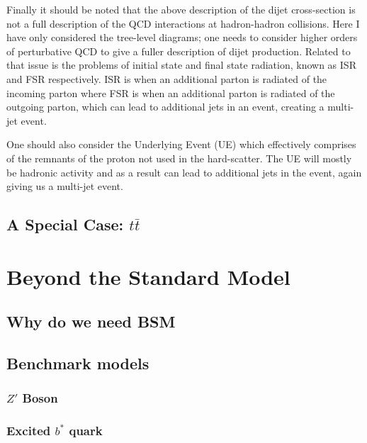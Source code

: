 Finally it should be noted that the above description of the dijet cross-section is
not a full description of the QCD interactions at hadron-hadron collisions.
Here I have only considered the tree-level diagrams;
one needs to consider higher orders of perturbative QCD to give a fuller description of dijet production.
Related to that issue is the problems of initial state and final state radiation, known as ISR and FSR respectively.
ISR is when an additional parton is radiated of the incoming parton where FSR is when an additional parton is radiated of the outgoing parton,
which can lead to additional jets in an event, creating a multi-jet event.

One should also consider the Underlying Event (UE) which effectively comprises of the remnants of the proton not used in the hard-scatter.
The UE will mostly be hadronic activity and as a result can lead to additional jets in the event, again giving us a multi-jet event.



\subsection{A Special Case: $t\bar{t}$}



\section{Beyond the Standard Model}
\label{theo-bsm}

\subsection{Why do we need BSM}
\subsection{Benchmark models}
\subsubsection{$Z'$ Boson}
\subsubsection{Excited $b^*$ quark}
